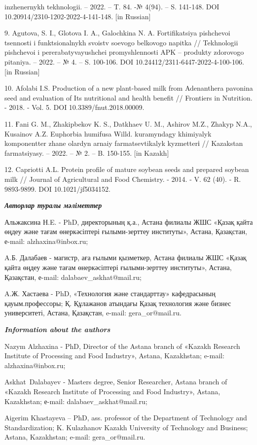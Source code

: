 \begin{noparindent}
inzhenernykh tekhnologii. --
2022. -- T. 84. -№ 4(94). -- S. 141-148. DOI
10.20914/2310-1202-2022-4-141-148. {[}in Russian{]}

9. Agutova, S. I., Glotova I. A., Galochkina N. A. Fortifikatsiya
pishchevoi tsennosti i funktsional\textquotesingle nykh svoistv soevogo
belkovogo napitka // Tekhnologii pishchevoi i pererabatyvayushchei
promyshlennosti APK -- produkty zdorovogo pitaniya. -- 2022. -- № 4. --
S. 100-106. DOI 10.24412/2311-6447-2022-4-100-106. {[}in Russian{]}

10. Afolabi I.S. Production of a new plant-based milk from Adenanthera
pavonina seed and evaluation of Its nutritional and health benefit //
Frontiers in Nutrition. - 2018. - Vol. 5. DOI 10.3389/fnut.2018.00009.

11. Ғani G. M., Zhakipbekov K. S., Datkhaev U. M., Ashirov M.Z., Zhakyp
N.A., Kusainov A.Z. Euphorbia humifusa Willd. kuramyndagy khimiyalyk
komponentter zhane olardyn arnaiy farmatsevtikalyk kyzmetterі //
Kazakstan farmatsiyasy. -- 2022. -- № 2. -- B. 150-155. {[}in Kazakh{]}

12. Capriotti A.L. Protein profile of mature soybean seeds and prepared
soybean milk // Journal of Agricultural and Food Chemistry. - 2014. - V.
62 (40). - R. 9893-9899. DOI 10.1021/jf5034152.
\end{noparindent}

\emph{{\bfseries Авторлар туралы мәліметтер}}

\begin{noparindent}
Альжаксина Н.E. - PhD, директорының қ.а., Астана филиалы ЖШС «Қазақ
қайта өңдеу және тағам өнеркәсіптері ғылыми-зерттеу институты», Астана,
Қазақстан, е-mail: alzhaxina@inbox.ru;

A.Б. Далабаев - магистр, аға ғылыми қызметкер, Астана филиалы ЖШС «Қазақ
қайта өңдеу және тағам өнеркәсіптері ғылыми-зерттеу институты», Астана,
Қазақстан, е-mail: dalabaev\_askhat@mail.ru;

A.Ж. Хастаева - PhD, «Технология және стандарттау» кафедрасының
қауым.профессоры; Қ. Құлажанов атындағы Қазақ технология және бизнес
университеті, Астана, Қазақстан, e-mail: gera\_or@mail.ru.
\end{noparindent}

\emph{{\bfseries Information about the authors}}

\begin{noparindent}
Nazym Alzhaxina - PhD, Director of the Astana branch of «Kazakh Research
Institute of Processing and Food Industry», Astana, Kazakhstan; e-mail:
alzhaxina@inbox.ru;

Askhat~Dalabayev - Masters degree, Senior Researcher, Astana branch of
«Kazakh Research Institute of Processing and Food Industry», Astana,
Kazakhstan; е-mail: dalabaev\_askhat@mail.ru;

Aigerim Khastayeva -- PhD, ass. professor of the Department of
Technology and Standardization; K. Kulazhanov Kazakh University of
Technology and Business; Astana, Kazakhstan; e-mail: gera\_or@mail.ru.
\end{noparindent}
